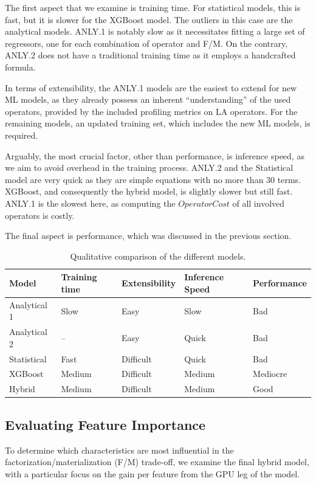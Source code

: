 The first aspect that we examine is training time. For statistical models, this is fast, but it is slower for the XGBoost model. The outliers in this case are the analytical models. ANLY.1 is notably slow as it necessitates fitting a large set of regressors, one for each combination of operator and F/M. On the contrary, ANLY.2 does not have a traditional training time as it employs a handcrafted formula.

In terms of extensibility, the ANLY.1 models are the easiest to extend for new ML models, as they already possess an inherent ``understanding'' of the used operators, provided by the included profiling metrics on LA operators. For the remaining models, an updated training set, which includes the new ML models, is required.

Arguably, the most crucial factor, other than performance, is inference speed, as we aim to avoid overhead in the training process. ANLY.2 and the Statistical model are very quick as they are simple equations with no more than $30$ terms. XGBoost, and consequently the hybrid model, is slightly slower but still fast. ANLY.1 is the slowest here, as computing the $OperatorCost$ of all involved operators is costly.

The final aspect is performance, which was discussed in the previous section.

\begin{table}[ht]
    \centering
    \begin{tabular}{lllll}
        \toprule
        Model        & Training time & Extensibility & Inference Speed & Performance \\
        \midrule
        Analytical 1 & Slow          & Easy          & Slow            & Bad         \\
        Analytical 2 & --            & Easy          & Quick           & Bad         \\
        Statistical  & Fast          & Difficult     & Quick           & Bad         \\
        XGBoost      & Medium        & Difficult     & Medium          & Mediocre    \\
        Hybrid       & Medium        & Difficult     & Medium          & Good        \\
        \bottomrule
    \end{tabular}
    \caption{Qualitative comparison of the different models.}
    \label{tab:5-meta-results}
\end{table}

\subsection{Evaluating Feature Importance}
\label{subsec:6-feature-importance}
To determine which characteristics are most influential in the factorization/materialization (F/M) trade-off, we examine the final hybrid model, with a particular focus on the gain per feature from the GPU leg of the model.

